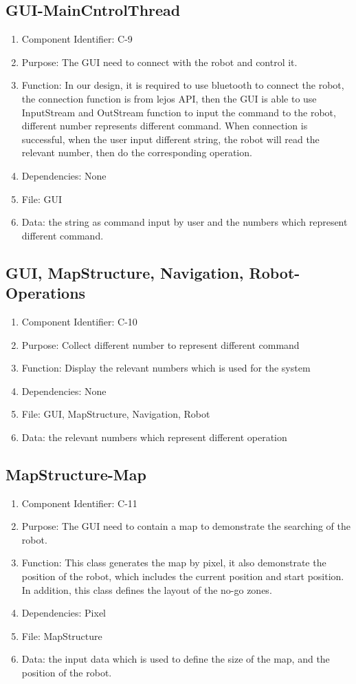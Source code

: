 \documentclass[11pt, a4paper]{report}
\begin{document}
\subsection{GUI-MainCntrolThread}
\begin{enumerate}
\item Component Identifier: C-9
\item Purpose: The GUI need to connect with the robot and control it.
\item Function: In our design, it is required to use bluetooth to connect the robot, the connection function is from lejos API, then the GUI is able to use InputStream and OutStream function to input the command to the robot, different number represents different command. When connection is successful, when the user input different string, the robot will read the relevant number, then do the corresponding operation.   
\item Dependencies: None
\item File: GUI
\item Data: the string as command input by user and the numbers which represent different command. 
\end{enumerate}

\subsection{GUI, MapStructure, Navigation, Robot-Operations}
\begin{enumerate}
\item Component Identifier: C-10
\item Purpose: Collect different number to represent different command
\item Function: Display the relevant numbers which is used for the system
\item Dependencies: None
\item File: GUI, MapStructure, Navigation, Robot
\item Data: the relevant numbers which represent different operation
\end{enumerate}

\subsection{MapStructure-Map}
\begin{enumerate}
\item Component Identifier: C-11
\item Purpose: The GUI need to contain a map to demonstrate the searching of the robot. 
\item Function: This class generates the map by pixel, it also demonstrate the position of the robot, which includes the current position and start position. In addition, this class defines the layout of the no-go zones.
\item Dependencies: Pixel
\item File: MapStructure
\item Data: the input data which is used to define the size of the map, and the position of the robot.
\end{enumerate}
\end{document}

